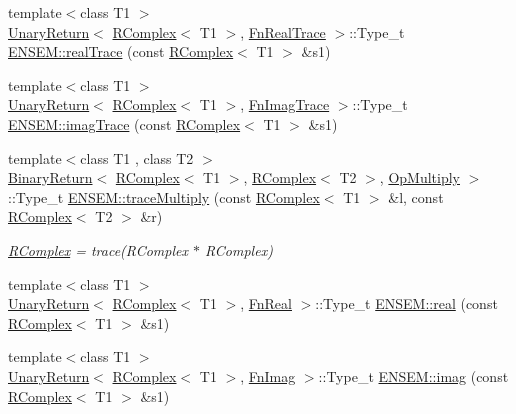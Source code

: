\begin{DoxyCompactItemize}
\item 
{\footnotesize template$<$class T1 $>$ }\\\mbox{\hyperlink{structENSEM_1_1UnaryReturn}{Unary\+Return}}$<$ \mbox{\hyperlink{classENSEM_1_1RComplex}{R\+Complex}}$<$ T1 $>$, \mbox{\hyperlink{structENSEM_1_1FnRealTrace}{Fn\+Real\+Trace}} $>$\+::Type\+\_\+t \mbox{\hyperlink{group__rcomplex_ga27bda5008ac5b345ddf3273c5949d00c}{E\+N\+S\+E\+M\+::real\+Trace}} (const \mbox{\hyperlink{classENSEM_1_1RComplex}{R\+Complex}}$<$ T1 $>$ \&s1)
\item 
{\footnotesize template$<$class T1 $>$ }\\\mbox{\hyperlink{structENSEM_1_1UnaryReturn}{Unary\+Return}}$<$ \mbox{\hyperlink{classENSEM_1_1RComplex}{R\+Complex}}$<$ T1 $>$, \mbox{\hyperlink{structENSEM_1_1FnImagTrace}{Fn\+Imag\+Trace}} $>$\+::Type\+\_\+t \mbox{\hyperlink{group__rcomplex_ga57832278e9583a5d6e01e547dfdbb896}{E\+N\+S\+E\+M\+::imag\+Trace}} (const \mbox{\hyperlink{classENSEM_1_1RComplex}{R\+Complex}}$<$ T1 $>$ \&s1)
\item 
{\footnotesize template$<$class T1 , class T2 $>$ }\\\mbox{\hyperlink{structENSEM_1_1BinaryReturn}{Binary\+Return}}$<$ \mbox{\hyperlink{classENSEM_1_1RComplex}{R\+Complex}}$<$ T1 $>$, \mbox{\hyperlink{classENSEM_1_1RComplex}{R\+Complex}}$<$ T2 $>$, \mbox{\hyperlink{structENSEM_1_1OpMultiply}{Op\+Multiply}} $>$\+::Type\+\_\+t \mbox{\hyperlink{group__rcomplex_gaf1ed70437ca66203b33532ddb96e2657}{E\+N\+S\+E\+M\+::trace\+Multiply}} (const \mbox{\hyperlink{classENSEM_1_1RComplex}{R\+Complex}}$<$ T1 $>$ \&l, const \mbox{\hyperlink{classENSEM_1_1RComplex}{R\+Complex}}$<$ T2 $>$ \&r)
\begin{DoxyCompactList}\small\item\em \mbox{\hyperlink{classENSEM_1_1RComplex}{R\+Complex}} = trace(\+R\+Complex $\ast$ R\+Complex) \end{DoxyCompactList}\item 
{\footnotesize template$<$class T1 $>$ }\\\mbox{\hyperlink{structENSEM_1_1UnaryReturn}{Unary\+Return}}$<$ \mbox{\hyperlink{classENSEM_1_1RComplex}{R\+Complex}}$<$ T1 $>$, \mbox{\hyperlink{structENSEM_1_1FnReal}{Fn\+Real}} $>$\+::Type\+\_\+t \mbox{\hyperlink{group__rcomplex_gac6f6a1d512bae897437df14ec96570a7}{E\+N\+S\+E\+M\+::real}} (const \mbox{\hyperlink{classENSEM_1_1RComplex}{R\+Complex}}$<$ T1 $>$ \&s1)
\item 
{\footnotesize template$<$class T1 $>$ }\\\mbox{\hyperlink{structENSEM_1_1UnaryReturn}{Unary\+Return}}$<$ \mbox{\hyperlink{classENSEM_1_1RComplex}{R\+Complex}}$<$ T1 $>$, \mbox{\hyperlink{structENSEM_1_1FnImag}{Fn\+Imag}} $>$\+::Type\+\_\+t \mbox{\hyperlink{group__rcomplex_ga983adfaddb65779a64c1a6d201bea704}{E\+N\+S\+E\+M\+::imag}} (const \mbox{\hyperlink{classENSEM_1_1RComplex}{R\+Complex}}$<$ T1 $>$ \&s1)

\end{DoxyCompactItemize}
